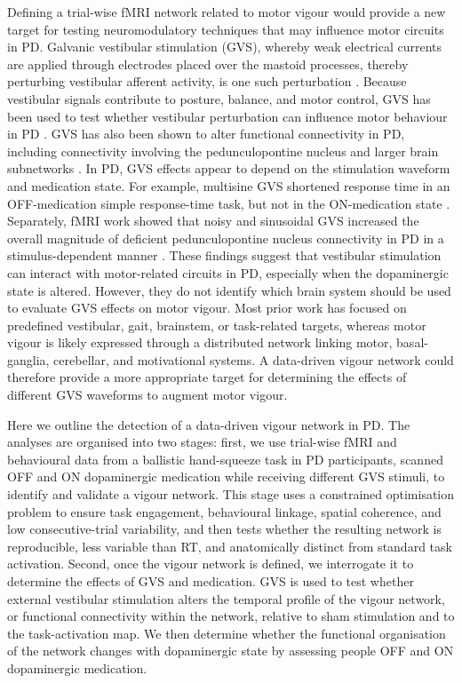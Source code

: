 \documentclass[utf8]{FrontiersinHarvard}
\begin{document}
Defining a trial-wise fMRI network related to motor vigour would provide a new target for testing neuromodulatory techniques that may influence motor circuits in PD. Galvanic vestibular stimulation (GVS), whereby weak electrical currents are applied through electrodes placed over the mastoid processes, thereby perturbing vestibular afferent activity, is one such perturbation \citep{fitzpatrick2004probing,kwan2019neural}. Because vestibular signals contribute to posture, balance, and motor control, GVS has been used to test whether vestibular perturbation can influence motor behaviour in PD \citep{lee2015multifaceted,lee2021frequency}. GVS has also been shown to alter functional connectivity in PD, including connectivity involving the pedunculopontine nucleus and larger brain subnetworks \citep{cai2018galvanic,liu2021galvanic}. In PD, GVS effects appear to depend on the stimulation waveform and medication state. For example, multisine GVS shortened response time in an OFF-medication simple response-time task, but not in the ON-medication state \citep{lee2021frequency}. Separately, fMRI work showed that noisy and sinusoidal GVS increased the overall magnitude of deficient pedunculopontine nucleus connectivity in PD in a stimulus-dependent manner \citep{cai2018galvanic}. These findings suggest that vestibular stimulation can interact with motor-related circuits in PD, especially when the dopaminergic state is altered. However, they do not identify which brain system should be used to evaluate GVS effects on motor vigour. Most prior work has focused on predefined vestibular, gait, brainstem, or task-related targets, whereas motor vigour is likely expressed through a distributed network linking motor, basal-ganglia, cerebellar, and motivational systems. A data-driven vigour network could therefore provide a more appropriate target for determining the effects of different GVS waveforms to augment motor vigour.

Here we outline the detection of a data-driven vigour network in PD. The analyses are organised into two stages: first, we use trial-wise fMRI and behavioural data from a ballistic hand-squeeze task in PD participants, scanned OFF and ON dopaminergic medication while receiving different GVS stimuli, to identify and validate a vigour network. This stage uses a constrained optimisation problem to ensure task engagement, behavioural linkage, spatial coherence, and low consecutive-trial variability, and then tests whether the resulting network is reproducible, less variable than RT, and anatomically distinct from standard task activation. Second, once the vigour network is defined, we interrogate it to determine the effects of GVS and medication. GVS is used to test whether external vestibular stimulation alters the temporal profile of the vigour network, or functional connectivity within the network, relative to sham stimulation and to the task-activation map. We then determine whether the functional organisation of the network changes with dopaminergic state by assessing people OFF and ON dopaminergic medication.
\end{document}
